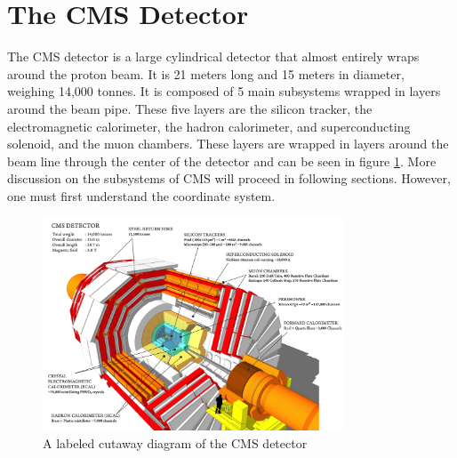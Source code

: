 \section{The CMS Detector}

The CMS detector is a large cylindrical detector that almost entirely wraps around the proton beam. It is 21 meters long and 15 meters in diameter, weighing 14,000 tonnes. It is composed of 5 main subsystems wrapped in layers around the beam pipe. These five layers are the silicon tracker, the electromagnetic calorimeter, the hadron calorimeter, and superconducting solenoid, and the muon chambers. These layers are wrapped in layers around the beam line through the center of the detector and can be seen in figure \ref{fig:cms-detector-cutout.png}. More discussion on the subsystems of CMS will proceed in following sections. However, one must first understand the coordinate system.

\begin{figure}[htbp]
    \centering
    \includegraphics[width=0.8\textwidth]{figures/chapter3/cms-detector-cutout.png}
    \caption{A labeled cutaway diagram of the CMS detector \cite{ref:sakuma}}
    \label{fig:cms-detector-cutout.png}
\end{figure}


